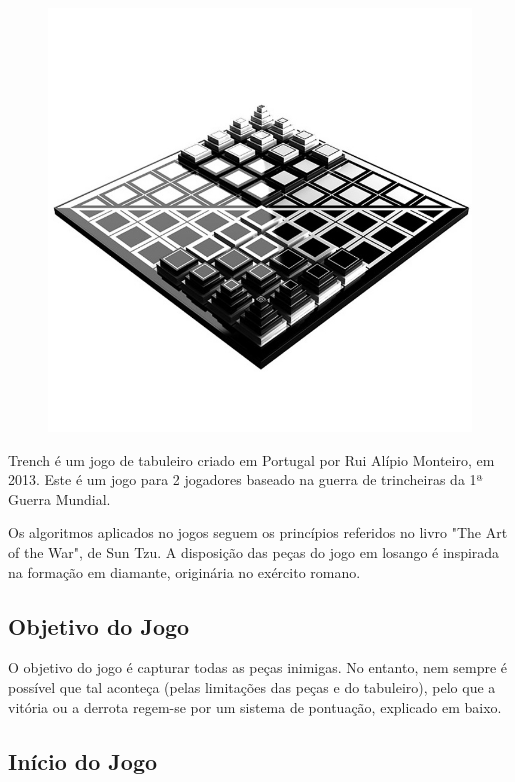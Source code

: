\documentclass[a4paper]{article}
\begin{document}
\begin{figure}[h!]
\begin{center}
\includegraphics[scale=0.3]{img/game-cover.jpg}
\label{fig:0}
\end{center}
\end{figure}

Trench é um jogo de tabuleiro criado em Portugal por Rui Alípio Monteiro, em 2013. Este é um jogo para 2 jogadores baseado na guerra de trincheiras da 1ª Guerra Mundial. 

Os algoritmos aplicados no jogos seguem os princípios referidos no livro "The Art of the War", de Sun Tzu. A disposição das peças do jogo em losango é inspirada na formação em diamante, originária no exército romano.

\subsection{Objetivo do Jogo}

O objetivo do jogo é capturar todas as peças inimigas. No entanto, nem sempre é possível que tal aconteça (pelas limitações das peças e do tabuleiro), pelo que a vitória ou a derrota regem-se por um sistema de pontuação, explicado em baixo.

\subsection{Início do Jogo}
\end{document}
